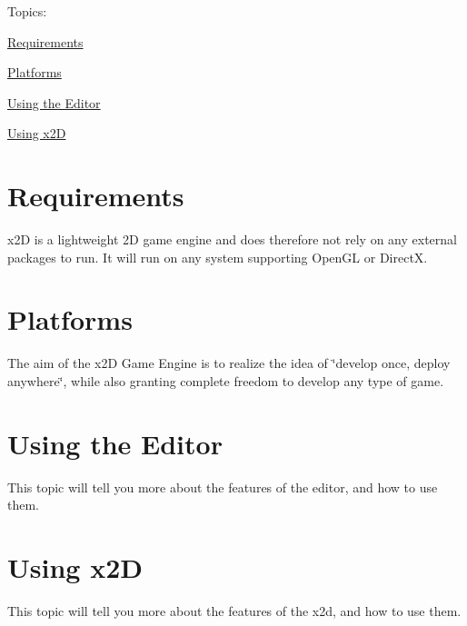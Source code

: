 Topics\+:
\begin{DoxyItemize}
\item \hyperlink{require}{Requirements}
\item \hyperlink{platforms}{Platforms}
\item \hyperlink{using_editor}{Using the Editor}
\item \hyperlink{using_x2d}{Using x2\+D} 
\end{DoxyItemize}\hypertarget{require}{}\section{Requirements}\label{require}
x2\+D is a lightweight 2\+D game engine and does therefore not rely on any external packages to run. It will run on any system supporting Open\+G\+L or Direct\+X. \hypertarget{platforms}{}\section{Platforms}\label{platforms}
The aim of the x2\+D Game Engine is to realize the idea of \char`\"{}develop once, deploy anywhere\char`\"{}, while also granting complete freedom to develop any type of game. \hypertarget{using_editor}{}\section{Using the Editor}\label{using_editor}
This topic will tell you more about the features of the editor, and how to use them. \hypertarget{using_x2d}{}\section{Using x2\+D}\label{using_x2d}
This topic will tell you more about the features of the x2d, and how to use them. 